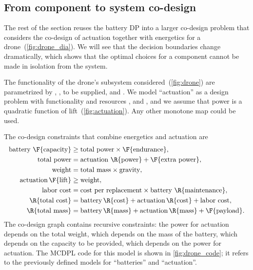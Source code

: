 \subsection{From component to system co-design}

The rest of the section reuses the battery DP into a larger co-design
problem that considers the co-design of actuation together with energetics
for a drone~(\cref{fig:drone_dia}). We will see that the decision
boundaries change dramatically, which shows that the optimal choices
for a component cannot be made in isolation from the system.

The functionality of the drone's subsystem considered~(\cref{fig:drone})
are parametrized by , ,  to be supplied, and . We model ``actuation''
as a design problem with functionality  and resources
,  and , and we assume that power is
a quadratic function of lift~(\cref{fig:actuation}). Any other monotone
map could be used.


\noindent The co-design constraints that combine energetics and actuation
are{\small{}
\begin{align}
\text{battery }\F{\text{capacity}} & \geq\text{total power}\times\F{\text{endurance}},\label{eq:drone_eq_first}\\
\text{total power} & =\text{actuation }\R{\text{power}}+\F{\text{extra power}},\nonumber \\
\text{weight} & =\text{total mass}\times\text{gravity},\nonumber \\
\text{actuation}\,\F{\text{lift}} & \geq\text{weight},\nonumber \\
\text{labor cost} & =\text{cost per replacement}\times\text{battery }\R{\text{maintenance}},\nonumber \\
\R{\text{total cost}} & =\text{battery}\,\R{\text{cost}}+\text{actuation}\,\R{\text{cost}}+\text{labor cost},\nonumber \\
\R{\text{total mass}} & =\text{battery}\,\R{\text{mass}}+\text{actuation}\,\R{\text{mass}}+\F{\text{payload}}.\label{eq:drone_eq_last}
\end{align}
}The co-design graph contains recursive constraints: the power for
actuation depends on the total weight, which depends on the mass of
the battery, which depends on the capacity to be provided, which depends
on the power for actuation. The MCDPL code  for this model is shown
in \cref{fig:drone_code}; it refers to the previously defined models
for ``batteries'' and ``actuation''.

